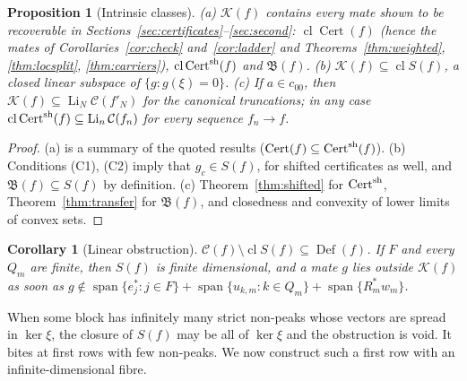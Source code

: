 \documentclass[10pt]{amsart}
\newtheorem{proposition}[theorem]{Proposition}
\newtheorem{corollary}[theorem]{Corollary}
\theoremstyle{definition}
\theoremstyle{remark}
\newcommand{\spn}{\operatorname{span}}
\newcommand{\Cset}{\mathcal C}
\newcommand{\Cert}{\operatorname{Cert}}
\newcommand{\Li}{\operatorname*{Li}}
\newcommand{\cl}{\operatorname{cl}}
\newcommand{\Def}{\operatorname{Def}}
\begin{document}
\begin{proposition}[Intrinsic classes]\label{prop:intrinsic}
\textup{(a)} $\mathcal K(f)$ contains every mate shown to be recoverable in
Sections~\ref{sec:certificates}--\ref{sec:second}: $\cl\Cert(f)$ (hence the
mates of Corollaries~\ref{cor:check} and~\ref{cor:ladder} and
Theorems~\ref{thm:weighted}, \ref{thm:locsplit}, \ref{thm:carriers}),
$\cl\Cert^{\rm sh}(f)$ and $\mathfrak B(f)$.
\textup{(b)} $\mathcal K(f)\subseteq\cl S(f)$, a closed linear subspace of
$\{g:g(\xi)=0\}$.
\textup{(c)} If $a\in c_{00}$, then $\mathcal K(f)\subseteq\Li_N\Cset(f'_N)$
for the canonical truncations; in any case $\cl\Cert^{\rm sh}(f)\subseteq
\Li_n\Cset(f_n)$ for every sequence $f_n\to f$.
\end{proposition}

\begin{proof}
(a) is a summary of the quoted results ($\Cert(f)\subseteq\Cert^{\rm
sh}(f)$).  (b) Conditions (C1), (C2) imply that $g_c\in S(f)$, for
shifted certificates as well, and $\mathfrak B(f)\subseteq S(f)$ by
definition.  (c) Theorem~\ref{thm:shifted} for $\Cert^{\rm sh}$,
Theorem~\ref{thm:transfer} for $\mathfrak B(f)$, and closedness and
convexity of lower limits of convex sets.
\end{proof}

\begin{corollary}[Linear obstruction]\label{cor:linear}
$\Cset(f)\setminus\cl S(f)\subseteq\Def(f)$.  If $F$ and every $Q_m$ are
finite, then $S(f)$ is finite dimensional, and a mate $g$ lies outside
$\mathcal K(f)$ as soon as $g\notin\spn\{e_j^*:j\in F\}+\spn\{u_{k,m}:k\in
Q_m\}+\spn\{R_m^*w_m\}$.
\end{corollary}

When some block has infinitely many strict non-peaks whose vectors are
spread in $\ker\xi$, the closure of $S(f)$ may be all of $\ker\xi$ and the
obstruction is void.  It bites at first rows with few non-peaks.  We now
construct such a first row with an infinite-dimensional fibre.
\end{document}
